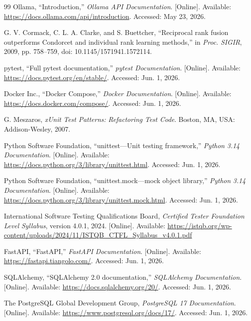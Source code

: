 \begin{thebibliography}{99}
Ollama, ``Introduction,'' \textit{Ollama API Documentation}. [Online]. Available: \url{https://docs.ollama.com/api/introduction}. Accessed: May 23, 2026.

G. V. Cormack, C. L. A. Clarke, and S. Buettcher, ``Reciprocal rank fusion outperforms Condorcet and individual rank learning methods,'' in \textit{Proc. SIGIR}, 2009, pp. 758--759, doi: 10.1145/1571941.1572114.

pytest, ``Full pytest documentation,'' \textit{pytest Documentation}. [Online]. Available: \url{https://docs.pytest.org/en/stable/}. Accessed: Jun. 1, 2026.

Docker Inc., ``Docker Compose,'' \textit{Docker Documentation}. [Online]. Available: \url{https://docs.docker.com/compose/}. Accessed: Jun. 1, 2026.

G. Meszaros, \textit{xUnit Test Patterns: Refactoring Test Code}. Boston, MA, USA: Addison-Wesley, 2007.

Python Software Foundation, ``unittest---Unit testing framework,'' \textit{Python 3.14 Documentation}. [Online]. Available: \url{https://docs.python.org/3/library/unittest.html}. Accessed: Jun. 1, 2026.

Python Software Foundation, ``unittest.mock---mock object library,'' \textit{Python 3.14 Documentation}. [Online]. Available: \url{https://docs.python.org/3/library/unittest.mock.html}. Accessed: Jun. 1, 2026.

International Software Testing Qualifications Board, \textit{Certified Tester Foundation Level Syllabus}, version 4.0.1, 2024. [Online]. Available: \url{https://istqb.org/wp-content/uploads/2024/11/ISTQB_CTFL_Syllabus_v4.0.1.pdf}

FastAPI, ``FastAPI,'' \textit{FastAPI Documentation}. [Online]. Available: \url{https://fastapi.tiangolo.com/}. Accessed: Jun. 1, 2026.

SQLAlchemy, ``SQLAlchemy 2.0 documentation,'' \textit{SQLAlchemy Documentation}. [Online]. Available: \url{https://docs.sqlalchemy.org/20/}. Accessed: Jun. 1, 2026.

The PostgreSQL Global Development Group, \textit{PostgreSQL 17 Documentation}. [Online]. Available: \url{https://www.postgresql.org/docs/17/}. Accessed: Jun. 1, 2026.


\end{thebibliography}
